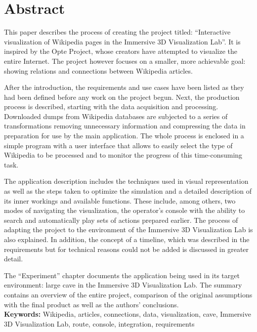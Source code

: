 \chapter*{Abstract}
This paper describes the process of creating the project titled: ``Interactive visualization of Wikipedia pages in the Immersive 3D Visualization Lab''. It is inspired by the Opte Project, whose creators have attempted to visualize the entire Internet. The project however focuses on a smaller, more achievable goal: showing relations and connections between Wikipedia articles.

After the introduction, the requirements and use cases have been listed as they had been defined before any work on the project begun. Next, the production process is described, starting with the data acquisition and processing. Downloaded dumps from Wikipedia databases are subjected to a series of transformations removing unnecessary information and compressing the data in preparation for use by the main application. The whole process is enclosed in a simple program with a user interface that allows to easily select the type of Wikipedia to be processed and to monitor the progress of this time-consuming task.

The application description includes the techniques used in visual representation as well as the steps taken to optimize the simulation and a detailed description of its inner workings and available functions. These include, among others, two modes of navigating the visualization, the operator's console with the ability to search and automatically play sets of actions prepared earlier. The process of adapting the project to the environment of the Immersive 3D Visualization Lab is also explained. In addition, the concept of a timeline, which was described in the requirements but for technical reasons could not be added is discussed in greater detail.

The ``Experiment'' chapter documents the application being used in its target environment: large cave in the Immersive 3D Visualization Lab. The summary contains an overview of the entire project, comparison of the original assumptions with the final product as well as the authors' conclusions.\\

\noindent\textbf{Keywords:} Wikipedia, articles, connections, data, visualization, cave, Immersive 3D Visualization Lab, route, console, integration, requirements
